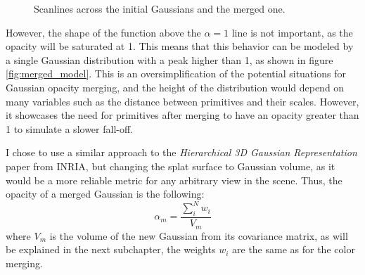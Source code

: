 \begin{figure}[H]
    \centering
    
    \caption{Scanlines across the initial Gaussians and the merged one.}
    \label{fig:blendfig}
\end{figure}

However, the shape of the function above the $\alpha = 1$ line is not important, as the opacity will be saturated at 1. This means that this behavior can be modeled by a single Gaussian distribution with a peak higher than 1, as shown in figure \ref{fig:merged_model}. This is an oversimplification of the potential situations for Gaussian opacity merging, and the height of the distribution would depend on many variables such as the distance between primitives and their scales. However, it showcases the need for primitives after merging to have an opacity greater than 1 to simulate a slower fall-off.

\begin{figure}[H]
\end{figure}

I chose to use a similar approach to the \textit{Hierarchical 3D Gaussian Representation} paper from INRIA, but changing the splat surface to Gaussian volume, as it would be a more reliable metric for any arbitrary view in the scene. Thus, the opacity of a merged Gaussian is the following:
\[
\alpha_m = \frac{\sum_i^N w_i}{V_m}
\]
where $V_m$ is the volume of the new Gaussian from its covariance matrix, as will be explained in the next subchapter, the weights $w_i$ are the same as for the color merging.

